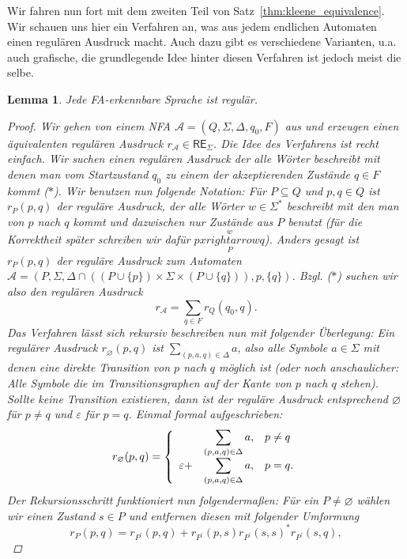 \documentclass[11pt, a4paper]{article}
\theoremstyle{definition}
\theoremstyle{plain}
\newtheorem{lemma}[definition]{Lemma}
\numberwithin{equation}{section}
\newcommand{\reachess}[2]{\overset{#1}{\underset{#2}{xrightarrow}}}
\let\emptyset\varnothing
\begin{document}
Wir fahren nun fort mit dem zweiten Teil von Satz~\ref{thm:kleene_equivalence}. Wir schauen uns hier ein Verfahren an, was aus jedem endlichen Automaten einen regulären Ausdruck macht. Auch dazu gibt es verschiedene Varianten, u.a. auch grafische, die grundlegende Idee hinter diesen Verfahren ist jedoch meist die selbe.
\begin{lemma}\label{lem:nfa2regex}
	Jede FA-erkennbare Sprache ist regulär.
	\begin{proof}
		Wir gehen von einem NFA $\mathcal{A} = (Q, \Sigma, \Delta, q_0, F)$ aus und erzeugen einen ä\-qui\-va\-len\-ten regulären Ausdruck $r_\mathcal{A} \in \mathsf{RE}_\Sigma$. Die Idee des Verfahrens ist recht einfach. Wir suchen einen regulären Ausdruck der alle Wörter beschreibt mit denen man vom Startzustand $q_0$ zu einem der akzeptierenden Zustände $q \in F$ kommt ($\ast$). Wir benutzen nun folgende Notation: Für $P \subseteq Q$ und $p, q \in Q$ ist $r_P(p, q)$ der reguläre Ausdruck, der alle Wörter $w \in \Sigma^\ast$ beschreibt mit den man von $p$ nach $q$ kommt und dazwischen nur Zustände aus $P$ benutzt (für die Korrektheit später schreiben wir dafür $p \reachess{w}{P} q$). Anders gesagt ist $r_P(p, q)$ der reguläre Ausdruck zum Automaten $\mathcal{A} = (P, \Sigma, \Delta \cap ((P \cup \{p\}) \times \Sigma \times (P \cup \{q\})), p, \{q\})$. Bzgl. ($\ast$) suchen wir also den regulären Ausdruck
		$$
			r_\mathcal{A} = \sum_{q \in F} r_Q(q_0, q).
		$$
		Das Verfahren lässt sich rekursiv beschreiben nun mit folgender Überlegung: Ein regulärer Ausdruck $r_\emptyset(p, q)$ ist $\sum_{(p, a, q) \in \Delta} a$, also alle Symbole $a \in \Sigma$ mit denen eine direkte Transition von $p$ nach $q$ möglich ist (oder noch anschaulicher: Alle Symbole die im Transitionsgraphen auf der Kante von $p$ nach $q$ stehen). Sollte keine Transition existieren, dann ist der reguläre Ausdruck entsprechend $\emptyset$ für $p \neq q$ und $\varepsilon$ für $p = q$. Einmal formal aufgeschrieben:
		$$
			r_\emptyset(p, q) = \left\lbrace
				\begin{array}{*3{>{\displaystyle}l}p{5cm}}
					\ &\sum_{(p, a, q) \in \Delta} a, & p \neq q\\
					\varepsilon + &\sum_{(p, a, q) \in \Delta} a, & p = q.
				\end{array}
			\right.
		$$
		Der Rekursionsschritt funktioniert nun folgendermaßen: Für ein $P \neq \emptyset$ wählen wir einen Zustand  $s \in P$ und entfernen diesen mit folgender Umformung
		$$
			r_P(p, q) = r_{P^\prime}(p, q) + r_{P^\prime}(p, s) r_{P^\prime}(s, s)^\ast r_{P^\prime}(s, q),
$$
\end{proof}
\end{lemma}
\end{document}
